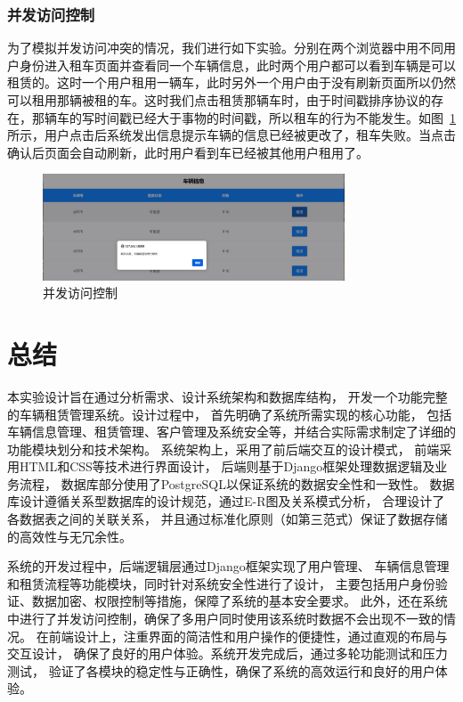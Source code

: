 \documentclass[UTF8,a4paper,12pt]{ctexart}
\begin{document}
\subsubsection{并发访问控制}
为了模拟并发访问冲突的情况，我们进行如下实验。分别在两个浏览器中用不同用户身份进入租车页面并查看同一个车辆信息，此时两个用户都可以看到车辆是可以租赁的。这时一个用户租用一辆车，此时另外一个用户由于没有刷新页面所以仍然可以租用那辆被租的车。这时我们点击租赁那辆车时，由于时间戳排序协议的存在，那辆车的写时间戳已经大于事物的时间戳，所以租车的行为不能发生。如图~\ref{fig:cur}所示，用户点击后系统发出信息提示车辆的信息已经被更改了，租车失败。当点击确认后页面会自动刷新，此时用户看到车已经被其他用户租用了。
\begin{figure}[htbp]  %
    \centering  %
    \includegraphics[width=0.8\textwidth]{pic/cur.png}
    \caption{并发访问控制}  %
    \label{fig:cur}  %
\end{figure}

\section{总结}

本实验设计旨在通过分析需求、设计系统架构和数据库结构，
开发一个功能完整的车辆租赁管理系统。设计过程中，
首先明确了系统所需实现的核心功能，
包括车辆信息管理、租赁管理、客户管理及系统安全等，并结合实际需求制定了详细的功能模块划分和技术架构。
系统架构上，采用了前后端交互的设计模式，
前端采用HTML和CSS等技术进行界面设计，
后端则基于Django框架处理数据逻辑及业务流程，
数据库部分使用了PostgreSQL以保证系统的数据安全性和一致性。
数据库设计遵循关系型数据库的设计规范，通过E-R图及关系模式分析，
合理设计了各数据表之间的关联关系，
并且通过标准化原则（如第三范式）保证了数据存储的高效性与无冗余性。

系统的开发过程中，后端逻辑层通过Django框架实现了用户管理、
车辆信息管理和租赁流程等功能模块，同时针对系统安全性进行了设计，
主要包括用户身份验证、数据加密、权限控制等措施，保障了系统的基本安全要求。
此外，还在系统中进行了并发访问控制，确保了多用户同时使用该系统时数据不会出现不一致的情况。
在前端设计上，注重界面的简洁性和用户操作的便捷性，通过直观的布局与交互设计，
确保了良好的用户体验。系统开发完成后，通过多轮功能测试和压力测试，
验证了各模块的稳定性与正确性，确保了系统的高效运行和良好的用户体验。
\end{document}
